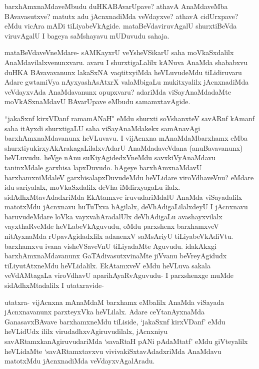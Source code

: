 \begin{artha}
barxhAmxnaMdaveMbudu duHKABAvarUpave? athavA AnaMdaveMba BAvavasutxve? matutx adu jAcnxnadiMda veVdayxve? athavA cidUrxpave? eMdu vicAra mADi tiLiyabeVkAgide. mataBeVdaviruvAgalU shurxtiBeVda viruvAgalU I bageya saMshayavu mUDuvudu sahaja. 
\end{artha}

\begin{artha}
mataBeVdaveVneMdare- sAMKayxrU veYsheVSikarU saha moVkaSxdalilx AnaMdavilalxvenunxvaru. avaru I shurxtigaLalilx kANuva AnaMda shababxvu duHKA BAvavavanunx lakaSxNA vaqtitxyiMda heVLuvudeMdu tiLidiruvaru Adare gwtamiVya nAyxyashAsAtxrX valaMbigaLu mukitxyalilx jAcnxnadiMda  veVdayxvAda AnaMdavanunx opupxvaru? adariMda viSayAnaMdadaMte moVkASxnaMdavU BAvarUpave eMbudu samamxtavAgide. 
\end{artha}%

\begin{artha}
``jakaSxnf kirxVDanf ramamANaH" eMdu shurxti soV\s shanxteV savARnf kAmanf saha itAyxdi shurxtigaLU saha viSayAnaMdakekx samAnavAgi barxhAmxnaMdavanunx heVLuvavu. I vijAcnxna mAnaMdaMbarxhamx eMba shurxtiyukirxyAkArakagaLilalxvAdarU AnaMdadaveVdana (anuBavavanunx) heVLuvudu. heVge nAnu suKiyAgidedxVneMdu savxkiVyAnaMdavu taninxMdale garxhisa lapxDuvudo. hAgeye barxhAmxnaMdavU barxhamxniMdaleV garxhisalapxDuvudeMdu heVLidare viroVdhaveVnu? eMdare idu sariyalalx, moVkaSxdalilx deVha iMdirxyagaLu ilalx. sidAdhxMtavAdadxriMda EkAtamxve iruvudariMdalU AnaMda viSayadalilx matotxMdu jAcnxnavu huTuTxva hAgilalx, deVhAdigaLilalxdeyU I jAcnxnavu baruvudeMdare loVka vayxvahAradalUlx deVhAdigaLu avashayxvilalx vayxthaRveMde heVLabeVkAguvudu, oMdu parxshenx barxhamxveV nitAyxnaMda rUpavAgidadxlilx adanenxV saMsAriyU tiLiyabeVkAdiVtu. barxhamxvu ivana visheVSaveVnU tiLiyadaMte Aguvudu. idakAkxgi barxhAmxnaMdavanunx GaTAdivasutxvinaMte jiVvanu beVreyAgidudx tiLiyutAtxneMdu heVLidalilx. EkAtamxveV eMdu heVLuva sakala veVdAMtagaLa viroVdhavU aparihAyaRvAguvudu- I parxshenxge muMde sidAdhxMtadalilx I utatxravide-
\end{artha}


\begin{artha}
utatxra- vijAcnxna mAnaMdaM barxhamx eMbalilx AnaMda viSayada jAcnxnavanunx parxteyxVka heVLilalx. Adare ceYtanAyxnaMda GanasavxBAvave barxhamxneMdu tiLiside, `jakaSxnf kirxVDanf' eMdu heVLidUdx ililx virudadhxvAgiruvudilalx, jAcnxniyu savARtamxkanAgiruvudariMda `savaRtaH pANi pAdaMtatf' eMdu giVteyalilx heVLidaMte `savARtamxtavxvu vivivakiSxtavAdadxriMda AnaMdavu matotxMdu jAcnxnadiMda veVdayxvAgalAradu.
\end{artha}

